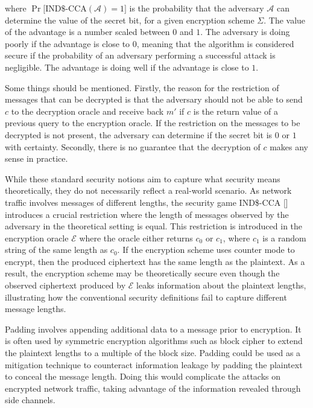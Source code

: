 where $\Pr \big[\text{IND\$-CCA} (\mathcal{A}) = 1 \big]$ is the probability that the adversary $\mathcal{A}$ can determine the value of the secret bit, for a given encryption scheme $\Sigma$. The value of the advantage is a number scaled between $0$ and $1$. The adversary is doing poorly if the advantage is close to $0$, meaning that the algorithm is considered secure if the probability of an adversary performing a successful attack is negligible. The advantage is doing well if the advantage is close to $1$.

Some things should be mentioned. Firstly, the reason for the restriction of messages that can be decrypted is that the adversary should not be able to send $c$ to the decryption oracle and receive back $m'$ if $c$ is the return value of a previous query to the encryption oracle. If the restriction on the messages to be decrypted is not present, the adversary can determine if the secret bit is $0$ or $1$ with certainty. Secondly, there is no guarantee that the decryption of $c$ makes any sense in practice.

While these standard security notions aim to capture what security means theoretically, they do not necessarily reflect a real-world scenario. As network traffic involves messages of different lengths, the security game IND\$-CCA [] introduces a crucial restriction where the length of messages observed by the adversary in the theoretical setting is equal. This restriction is introduced in the encryption oracle $\mathcal{E}$ where the oracle either returns $c_{0}$ or $c_{1}$, where $c_{1}$ is a random string of the same length as $c_{0}$. If the encryption scheme uses counter mode to encrypt, then the produced ciphertext has the same length as the plaintext. As a result, the encryption scheme may be theoretically secure even though the observed ciphertext produced by $\mathcal{E}$ leaks information about the plaintext lengths, illustrating how the conventional security definitions fail to capture different message lengths.

Padding involves appending additional data to a message prior to encryption. It is often used by symmetric encryption algorithms such as block cipher to extend the plaintext lengths to a multiple of the block size. Padding could be used as a mitigation technique to counteract information leakage by padding the plaintext to conceal the message length. Doing this would complicate the attacks on encrypted network traffic, taking advantage of the information revealed through side channels.

